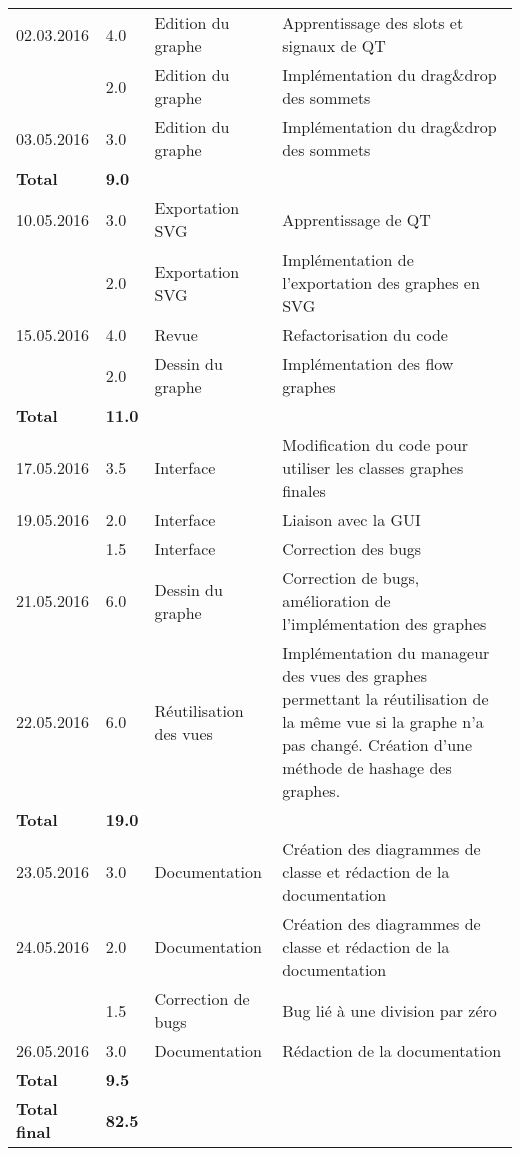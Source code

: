 \documentclass[french]{article}
\begin{document}
\begin{longtable}{p{}|p{}|p{}|p{}}
		02.03.2016 & 4.0 & Edition du graphe & Apprentissage des slots et signaux de QT \\		 
		           & 2.0 & Edition du graphe & Implémentation du drag\&drop des sommets \\
		03.05.2016 & 3.0 & Edition du graphe & Implémentation du drag\&drop des sommets \\
		\textbf{Total} & \textbf{9.0} && \\
		\hline

		10.05.2016 & 3.0 & Exportation SVG & Apprentissage de QT \\
		           & 2.0 & Exportation SVG & Implémentation de l'exportation des graphes en SVG \\
		15.05.2016 & 4.0 & Revue & Refactorisation du code \\
				   & 2.0 & Dessin du graphe & Implémentation des flow graphes \\
		\textbf{Total} & \textbf{11.0} && \\
		\hline
		
		17.05.2016 & 3.5 & Interface & Modification du code pour utiliser les classes graphes finales \\
		19.05.2016 & 2.0 & Interface & Liaison avec la GUI \\
				   & 1.5 & Interface & Correction des bugs \\
		21.05.2016 & 6.0 & Dessin du graphe & Correction de bugs, amélioration de l'implémentation des graphes \\
		22.05.2016 & 6.0 & Réutilisation des vues & Implémentation du manageur des vues des graphes permettant la réutilisation de la même vue si la graphe n'a pas changé. Création d'une méthode de hashage des graphes. \\
		\textbf{Total} & \textbf{19.0} && \\
		\hline
		
		23.05.2016 & 3.0 & Documentation & Création des diagrammes de classe et rédaction de la documentation \\
		24.05.2016 & 2.0 & Documentation & Création des diagrammes de classe et rédaction de la documentation \\
			       & 1.5 & Correction de bugs & Bug lié à une division par zéro \\
		26.05.2016 & 3.0 & Documentation & Rédaction de la documentation \\
		\textbf{Total} & \textbf{9.5} && \\
		\hline \hline
		
		\textbf{Total final} & \textbf{82.5} && \\	
	\end{longtable}
	
\end{document}
